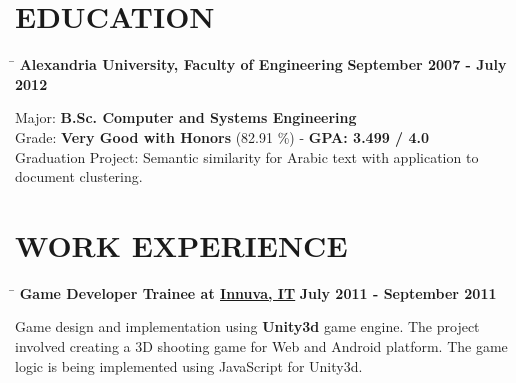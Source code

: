 \documentclass{res}
\begin{document}
 


\address{Current Residence\\
Los Angeles, USA}
\address{E-mail: \href{mailto:samer.samy.nazzir@gmail.com}{\underline{samer.samy.nazzir@gmail.com}} \\
Website: \href{http://sites.google.com/site/smeggaly/}{\underline{sites.google.com/site/smeggaly/}} \\
Date of birth: 05 December 19901}
                                  
\begin{resume}
 
\section{EDUCATION} 
	\vspace{-0.1in}
	\begin{tabbing}
	\hspace{4.4in}\= \kill
	\textbf{Alexandria University, Faculty of Engineering} \> \textbf{September 2007 - July 2012}\\
	\end{tabbing}\vspace{-35pt}
	Major: \textbf{B.Sc. Computer and Systems Engineering}\\
	Grade: \textbf{Very Good with Honors} (82.91 \%) - \textbf{GPA: 3.499 / 4.0}\\
	Graduation Project: Semantic similarity for Arabic text with application to document clustering.
	
\section{WORK EXPERIENCE \footnotemark }
	\vspace{-0.1in}
	\begin{tabbing}
	\hspace{4.4in}\= \kill
	\textbf{Game Developer Trainee at \href{http://sites.google.com/site/smeggaly/}{\underline{Innuva, IT}}} \> \textbf{July 2011 - September 2011}\\
	\end{tabbing}\vspace{-30pt}
	Game design and implementation using \textbf{Unity3d} game engine. The project involved creating a 3D shooting game for Web and Android platform. The game logic is being implemented using JavaScript for Unity3d.
	

\end{resume}
\end{document}
